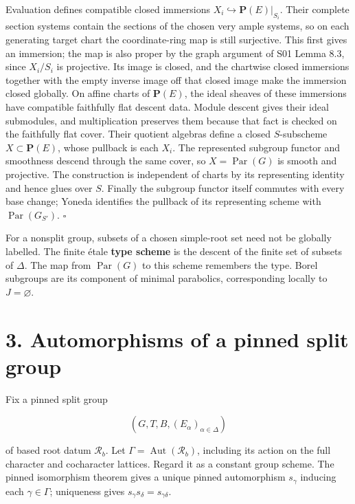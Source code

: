 \documentclass[11pt,a4paper,openany]{report}
\begin{document}
Evaluation defines compatible closed immersions \(X_i\hookrightarrow\mathbf P(E)|_{S_i}\). Their complete section systems contain the sections of the chosen very ample systems, so on each generating target chart the coordinate-ring map is still surjective. This first gives an immersion; the map is also proper by the graph argument of S01 Lemma 8.3, since \(X_i/S_i\) is projective. Its image is closed, and the chartwise closed immersions together with the empty inverse image off that closed image make the immersion closed globally. On affine charts of \(\mathbf P(E)\), the ideal sheaves of these immersions have compatible faithfully flat descent data. Module descent gives their ideal submodules, and multiplication preserves them because that fact is checked on the faithfully flat cover. Their quotient algebras define a closed \(S\)-subscheme \(X\subset\mathbf P(E)\), whose pullback is each \(X_i\). The represented subgroup functor and smoothness descend through the same cover, so \(X=\operatorname{Par}(G)\) is smooth and projective. The construction is independent of charts by its representing identity and hence glues over \(S\). Finally the subgroup functor itself commutes with every base change; Yoneda identifies the pullback of its representing scheme with \(\operatorname{Par}(G_{S'})\). \(\square\)

For a nonsplit group, subsets of a chosen simple-root set need not be globally labelled. The finite étale \textbf{type scheme} is the descent of the finite set of subsets of \(\Delta\). The map from \(\operatorname{Par}(G)\) to this scheme remembers the type. Borel subgroups are its component of minimal parabolics, corresponding locally to \(J=\varnothing\).

\section{3. Automorphisms of a pinned split group}\label{AG-RG-06-automorphisms-of-a-pinned-split-group}

Fix a pinned split group

\[
(G,T,B,(E_\alpha)_{\alpha\in\Delta})
\]

of based root datum \(\mathcal R_b\). Let \(\Gamma=\operatorname{Aut}(\mathcal R_b)\), including its action on the full character and cocharacter lattices. Regard it as a constant group scheme. The pinned isomorphism theorem gives a unique pinned automorphism \(s_\gamma\) inducing each \(\gamma\in\Gamma\); uniqueness gives \(s_\gamma s_\delta=s_{\gamma\delta}\).
\end{document}
